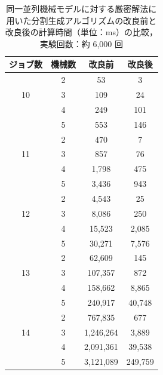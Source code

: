 \documentclass[12pt]{optlab-bachelor}
\begin{document}
\begin{table}[htb]
  \begin{center}
    \begin{tabular}{|c|c|c|c|} \hline
      ジョブ数 & 機械数 & 改良前 & 改良後 \\ \hline \hline
      & 2 & 53 & 3  \\ \cline{2-4}
      10 & 3 & 109 & 24  \\ \cline{2-4}
      & 4 & 249 & 101  \\ \cline{2-4}
      & 5 & 553 & 146  \\ \hline \hline
      & 2 & 470 & 7  \\ \cline{2-4}
      11 & 3 & 857 & 76 \\ \cline{2-4}
      & 4 & 1,798 & 475  \\ \cline{2-4}
      & 5 & 3,436 & 943  \\ \hline \hline
      & 2 & 4,543 & 25  \\ \cline{2-4}
      12 & 3 & 8,086 & 250  \\ \cline{2-4}
      & 4 & 15,523 & 2,085 \\ \cline{2-4}
      & 5 & 30,271 & 7,576   \\ \hline \hline
      & 2 & 62,609 & 145 \\ \cline{2-4}
      13 & 3 & 107,357 & 872 \\ \cline{2-4}
      & 4 & 158,662 & 8,865 \\ \cline{2-4}
      & 5 & 240,917 & 40,748 \\ \hline \hline
      & 2 & 767,835 & 677 \\ \cline{2-4}
      14 & 3 & 1,246,264 & 3,889 \\ \cline{2-4}
      & 4 & 2,091,361 & 39,538 \\ \cline{2-4}
      & 5 & 3,121,089 & 249,759  \\ \hline \hline
    \end{tabular}
    \caption{同一並列機械モデルに対する厳密解法に用いた分割生成アルゴリズムの改良前と改良後の計算時間（単位：ms）の比較，実験回数：約 6,000 回}
    \label{A1}
  \end{center}
\end{table}
\end{document}
